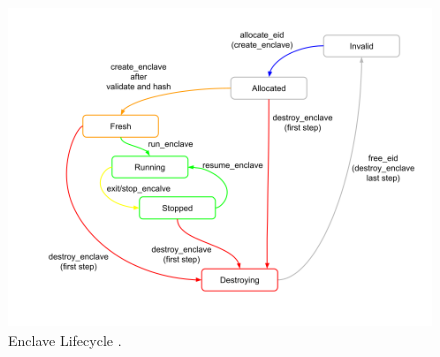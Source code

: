 \begin{figure}[h!]
    \centering
    \includegraphics[scale=0.45]{./chapters/images/Enclave lifecycle.png}
    \caption{Enclave Lifecycle \cite{keystone-doc}.}
    \label{enclave-lifecycle}
\end{figure}

